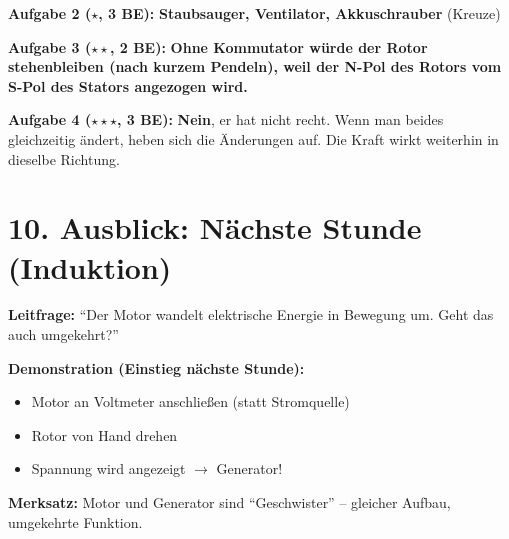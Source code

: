 \documentclass[11pt, a4paper]{article}
\newcommand{\lsg}[1]{\textcolor{error}{\textbf{#1}}}
\begin{document}
\begin{successbox}
\textbf{Aufgabe 2 ($\star$, 3 BE):} \lsg{Staubsauger, Ventilator, Akkuschrauber} (Kreuze)

\textbf{Aufgabe 3 ($\star\star$, 2 BE):} \lsg{Ohne Kommutator würde der Rotor stehenbleiben (nach kurzem Pendeln), weil der N-Pol des Rotors vom S-Pol des Stators angezogen wird.}

\textbf{Aufgabe 4 ($\star\star\star$, 3 BE):} \lsg{Nein}, er hat nicht recht. Wenn man beides gleichzeitig ändert, heben sich die Änderungen auf. Die Kraft wirkt weiterhin in dieselbe Richtung.

\end{successbox}


\section*{10. Ausblick: Nächste Stunde (Induktion)}

\begin{infobox}
\textbf{Leitfrage:} ``Der Motor wandelt elektrische Energie in Bewegung um. Geht das auch umgekehrt?''

\textbf{Demonstration (Einstieg nächste Stunde):}
\begin{itemize}
    \item Motor an Voltmeter anschließen (statt Stromquelle)
    \item Rotor von Hand drehen
    \item Spannung wird angezeigt $\rightarrow$ Generator!
\end{itemize}

\textbf{Merksatz:} Motor und Generator sind ``Geschwister'' -- gleicher Aufbau, umgekehrte Funktion.
\end{infobox}
\end{document}
